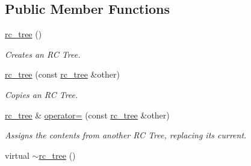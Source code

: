 \subsection*{Public Member Functions}
\begin{DoxyCompactItemize}
\item 
\hypertarget{classophidian_1_1interconnection_1_1rc__tree_a87e3ebed9d80a5c80867a8685374738b}{\hyperlink{classophidian_1_1interconnection_1_1rc__tree_a87e3ebed9d80a5c80867a8685374738b}{rc\-\_\-tree} ()}\label{classophidian_1_1interconnection_1_1rc__tree_a87e3ebed9d80a5c80867a8685374738b}

\begin{DoxyCompactList}\small\item\em Creates an R\-C Tree. \end{DoxyCompactList}\item 
\hypertarget{classophidian_1_1interconnection_1_1rc__tree_a0df0ca1855bfac8e8b762d1421de7017}{\hyperlink{classophidian_1_1interconnection_1_1rc__tree_a0df0ca1855bfac8e8b762d1421de7017}{rc\-\_\-tree} (const \hyperlink{classophidian_1_1interconnection_1_1rc__tree}{rc\-\_\-tree} \&other)}\label{classophidian_1_1interconnection_1_1rc__tree_a0df0ca1855bfac8e8b762d1421de7017}

\begin{DoxyCompactList}\small\item\em Copies an R\-C Tree. \end{DoxyCompactList}\item 
\hyperlink{classophidian_1_1interconnection_1_1rc__tree}{rc\-\_\-tree} \& \hyperlink{classophidian_1_1interconnection_1_1rc__tree_aa7c55c652bed438a4aee8f677b23106d}{operator=} (const \hyperlink{classophidian_1_1interconnection_1_1rc__tree}{rc\-\_\-tree} \&other)
\begin{DoxyCompactList}\small\item\em Assigns the contents from another R\-C Tree, replacing its current. \end{DoxyCompactList}\item 
\hypertarget{classophidian_1_1interconnection_1_1rc__tree_a22096aeed3b9bbff29ec45e16f2152d2}{virtual \hyperlink{classophidian_1_1interconnection_1_1rc__tree_a22096aeed3b9bbff29ec45e16f2152d2}{$\sim$rc\-\_\-tree} ()}\label{classophidian_1_1interconnection_1_1rc__tree_a22096aeed3b9bbff29ec45e16f2152d2}


\end{DoxyCompactItemize}
